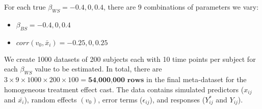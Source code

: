 \documentclass{article}
\begin{document}
\begin{itemize}
                    For each true $\beta_{WS} = -0.4, 0, 0.4$, there are 9 combinations of parameters we vary: 
                    \begin{itemize}
                        \item $\beta_{BS} = -0.4, 0, 0.4$
                        \item $corr(v_0,\bar{x}_i) = -0.25, 0, 0.25$
                    \end{itemize} 
            
                    We create 1000 datasets of 200 subjects each with 10 time points per subject for each $\beta_{WS}$ value to be estimated. In total, there are $3 \times 9 \times 1000 \times 200 \times 100 = \textbf{54,000,000 rows}$  in the final meta-dataset for the homogeneous treatment effect cast. The data contains simulated predictors ($x_{ij}$ and $\bar{x_i}$), random effects $(v_0)$, error terms ($\epsilon_{ij}$), and responses ($Y_{ij}^*$ and $Y_{ij}$).
            \end{itemize}
        
\end{document}
